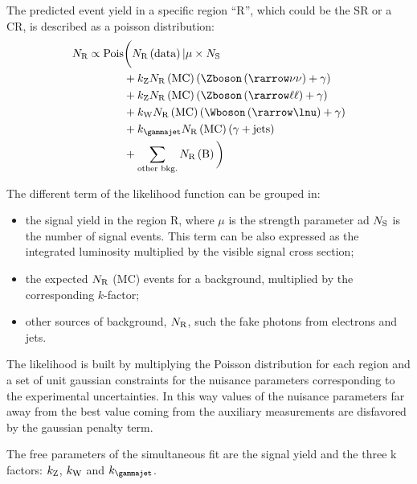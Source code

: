 The predicted event yield in a specific region ``R'', which could be the SR or a CR, is described as a poisson distribution:
\begin{equation}
\begin{split}
		N_\textup{R} \propto \text{Pois} &\bigg( N_\textup{R}\left(\text{data}\right)\vert \mu\times N_\textup{S} \\
						&+ k_{\textup{Z}} N_{\textup{R}}\left(\text{MC}\right) \left(\Zboson \left(\rarrow \nu\nu \right) +  \gamma\right) \\
						&+ k_{\textup{Z}}N_\textup{R}\left(\text{MC}\right) \left(\Zboson \left(\rarrow \ell\ell\right) + \gamma \right) \\
						&+ k_{\textup{W}}N_\textup{R}\left(\text{MC}\right) \left(\Wboson \left(\rarrow \lnu\right)+ \gamma \right) \\
					 	&+ k_{\gammajet}N_{\textup{R}}\left(\text{MC}\right) \left(\gamma + \text{jets} \right)\\  
					 	&+ \sum_{\textup{other bkg.}} N_{\textup{R}}\left(\text{B}\right) \bigg)
\end{split}
\label{eqn:nr}
\end{equation}

The different term of the likelihood function can be grouped in:
\begin{itemize}
\item the signal yield in the region R, where $\mu$ is the strength parameter ad $N_\textup{S}$ is the number of signal events. This term can be also expressed as the integrated luminosity multiplied by the visible signal cross section;
\item the expected $N_\textup{R}$ (MC) events for a background, multiplied by the corresponding $k$-factor;
\item other sources of background, $N_\textup{R}$, such the fake photons from electrons and jets.
\end{itemize}

The likelihood is built by multiplying the Poisson distribution for each region and a set of unit gaussian constraints for the nuisance parameters corresponding to the experimental uncertainties. In this way values of the nuisance parameters far away from the best value coming from the auxiliary measurements are disfavored by the gaussian penalty term.

The free parameters of the simultaneous fit are the signal yield and the three k factors: $k_{\textup{Z}}$, $k_{\textup{W}}$ and $k_{\gammajet}$.

